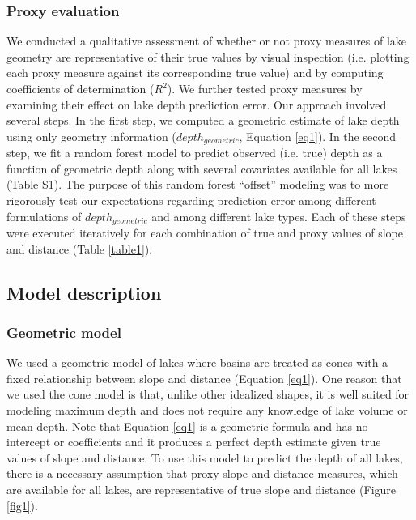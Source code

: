 \documentclass[draft]{agujournal2019}
\begin{document}
\subsubsection{Proxy evaluation}
\noindent
We conducted a qualitative assessment of whether or not proxy measures of lake geometry are representative of their true values by visual inspection (i.e. plotting each proxy measure against its corresponding true value) and by computing coefficients of determination ($R^2$). We further tested proxy measures by examining their effect on lake depth prediction error. Our approach involved several steps. In the first step, we computed a geometric estimate of lake depth using only geometry information ($depth_{geometric}$, Equation \ref{eq1}). In the second step, we fit a random forest model to predict observed (i.e. true) depth as a function of geometric depth along with several covariates available for all lakes (Table S1). The purpose of this random forest “offset” modeling was to more rigorously test our expectations regarding prediction error among different formulations of $depth_{geometric}$ and among different lake types. Each of these steps were executed iteratively for each combination of true and proxy values of slope and distance (Table \ref{table1}).

\subsection{Model description}
\subsubsection{Geometric model}
\noindent
We used a geometric model of lakes where basins are treated as cones with a fixed relationship between slope and distance (Equation \ref{eq1}). One reason that we used the cone model is that, unlike other idealized shapes, it is well suited for modeling maximum depth and does not require any knowledge of lake volume or mean depth. Note that Equation \ref{eq1} is a geometric formula and has no intercept or coefficients and it produces a perfect depth estimate given true values of slope and distance. To use this model to predict the depth of all lakes, there is a necessary assumption that proxy slope and distance measures, which are available for all lakes, are representative of true slope and distance (Figure \ref{fig1}).
\end{document}
